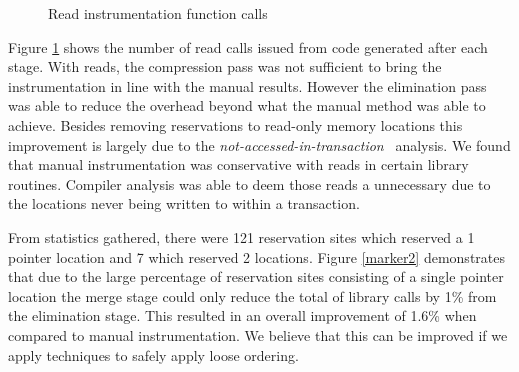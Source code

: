 \documentclass[preprint]{sigplanconf}
\begin{document}
\begin{figure}
    \caption{Read instrumentation function calls}\label{marker1}
\end{figure}

Figure \ref{marker1} shows the number of read calls issued from code generated after each stage. With reads, the compression pass was not sufficient to bring the instrumentation in line with the manual results. However the elimination pass was able to reduce the overhead beyond what the manual method was able to achieve. Besides removing reservations to read-only memory locations this improvement is largely due to the \emph{not-accessed-in-transaction}~\cite{Shpeisman:2007:EIO:1250734.1250744} analysis. We found that manual instrumentation was conservative with reads in certain library routines. Compiler analysis was able to deem those reads a unnecessary due to the locations never being written to within a transaction.

From statistics gathered, there were 121 reservation sites which reserved a 1 pointer location and 7 which reserved 2 locations. Figure \ref{marker2} demonstrates that due to the large percentage of reservation sites consisting of a single pointer location the merge stage could only reduce the total of library calls by 1\% from the elimination stage. This resulted in an overall improvement of 1.6\% when compared to manual instrumentation. We believe that this can be improved if we apply techniques to safely apply loose ordering.
\end{document}
